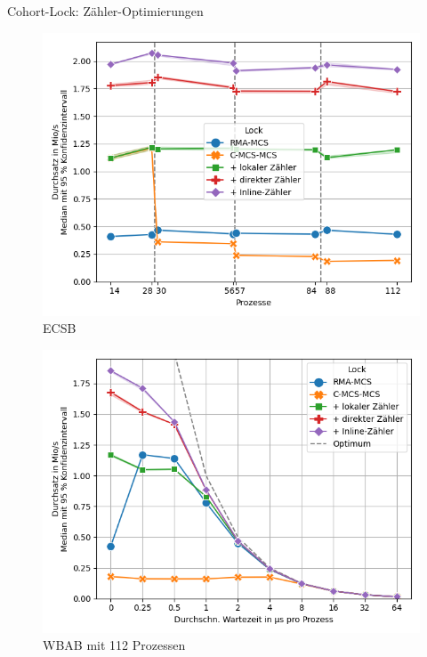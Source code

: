 \documentclass[fleqn,compress,utf8,aspectratio=169,t]{beamer}
\begin{document}
\begin{frame}{Cohort-Lock: Zähler-Optimierungen}
    \begin{minipage}{.49\textwidth}
        \begin{figure}
            \includegraphics[width=\textwidth]{../../Dokumentation/Latex/Bilder/benchmarks/intelmpi/cohort-counter-optimization/ECSB-throughput}
            \caption{ECSB}
        \end{figure}
    \end{minipage}
    \begin{minipage}{.49\textwidth}
        \begin{figure}
            \includegraphics[width=\textwidth]{../../Dokumentation/Latex/Bilder/benchmarks/intelmpi/cohort-counter-optimization/WBAB-processes=112,mpi_progress=1-throughput}
            \caption{WBAB mit 112 Prozessen}
        \end{figure}
    \end{minipage}
\end{frame}
\end{document}
